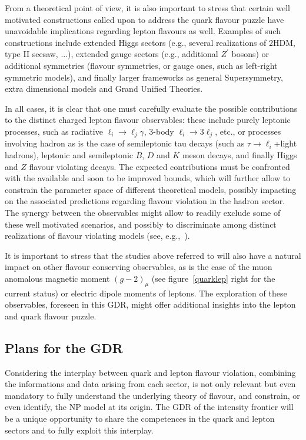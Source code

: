 From a theoretical point of view, it is also important to stress that
certain well motivated constructions called upon to address the quark flavour
puzzle have unavoidable implications regarding lepton flavours as
well. 
Examples of such constructions include extended Higgs sectors
(e.g., several realizations of 2HDM, type II seesaw, ...),
extended gauge sectors 
(e.g., additional $Z^\prime$ bosons) or additional symmetries  (flavour
symmetries, or gauge ones, such as left-right symmetric models), and finally 
larger frameworks as general Supersymmetry, extra dimensional models and
Grand Unified Theories. 

In all cases, it is clear that one must 
carefully evaluate the possible contributions to the
distinct charged lepton flavour observables: these include 
purely leptonic processes, such as 
radiative $\ell_i \to \ell_j \gamma$, 3-body $\ell_i \to 3\ell_j$,
etc., or processes involving hadron as is the case of semileptonic 
tau decays (such as $\tau \to \ell_i$+light hadrons), leptonic and 
semileptonic $B$, $D$
and $K$ meson decays,  and finally Higgs and $Z$ flavour violating
decays.
The expected contributions must be 
confronted with the available and soon to
be improved bounds, which will further allow to constrain the
parameter space of different theoretical models, possibly
impacting on the associated predictions regarding flavour
violation in the hadron sector. 
The synergy between the observables might allow to 
readily exclude some of these well motivated scenarios, and 
possibly to discriminate among distinct realizations of 
flavour violating models  (see, e.g.,~\cite{Abada:2014cca,Abada:2015zea,Abada:2015oba}). 

It is important to stress that the
studies above referred to 
will also have a natural impact on other flavour conserving 
observables, as is the case of the muon anomalous magnetic moment
$(g-2)_\mu$  (see figure~\ref{quarklep} right for the current status) 
or electric dipole moments of leptons. The exploration of these observables, foreseen in this GDR, might offer 
additional insights into the lepton and quark flavour puzzle.


\subsection*{Plans for the GDR}

Considering the interplay between quark and lepton flavour
violation, combining the informations and data arising from each
sector, is not only relevant but even mandatory to fully understand 
the underlying theory of flavour, and constrain, or even identify, 
the NP model at its origin. The GDR of the intensity frontier  will be a unique opportunity to share the competences in the quark and lepton sectors and to fully exploit this interplay. 



